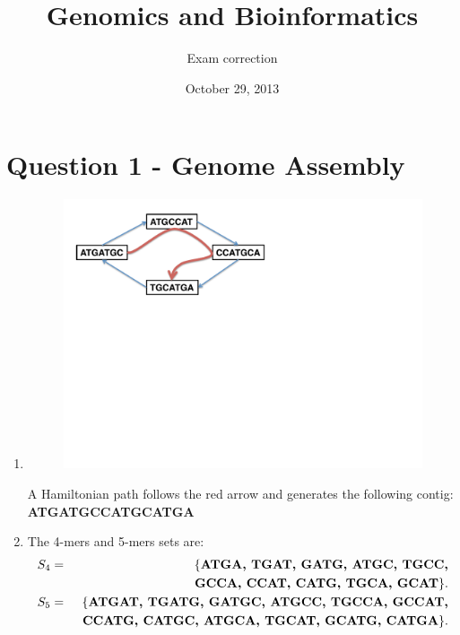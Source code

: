 \documentclass[a4paper,11pt]{article}
\title{Genomics and Bioinformatics}
\date{October 29, 2013}
\author{Exam correction}
\begin{document}
\maketitle

\section*{Question 1 - Genome Assembly}

\begin{enumerate}

\item
\begin{figure}[h]
\centering\includegraphics[scale=.8]{Hamilton.pdf}
\end{figure}

A Hamiltonian path follows the red arrow and generates the
following contig:\\
\textbf{ATGATGCCATGCATGA}

\item 
The 4-mers and 5-mers sets are:
\begin{eqnarray*}
  S_4 &=& \{\mbox{\bf ATGA, TGAT, GATG, ATGC, TGCC,} \\
  &&\phantom\{\mbox{\bf GCCA, CCAT, CATG, TGCA, GCAT}\}.\\
  S_5&=&\{\mbox{\bf ATGAT, TGATG, GATGC, ATGCC, TGCCA, GCCAT,} \\
  &&\phantom\{\mbox{\bf CCATG, CATGC, ATGCA, TGCAT, GCATG, CATGA}\}.
\end{eqnarray*}



\end{enumerate}
\end{document}
